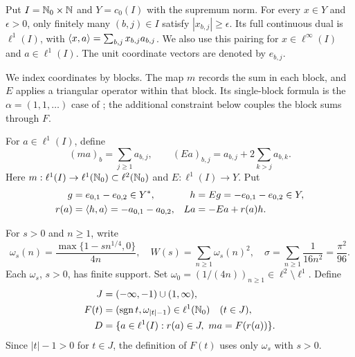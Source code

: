 Put $I=\mathbb N_0\times\mathbb N$ and $Y=c_0(I)$ with the supremum norm.
For every $x\in Y$ and $\epsilon>0$, only finitely many $(b,j)\in I$
satisfy $|x_{b,j}|\ge\epsilon$. Its full continuous dual is $\ell^1(I)$,
with $\langle x,a\rangle=\sum_{b,j}x_{b,j}a_{b,j}$. We also use this pairing
for $x\in\ell^\infty(I)$ and $a\in\ell^1(I)$.
The unit coordinate vectors are denoted by $e_{b,j}$.

We index coordinates by blocks. The map $m$ records the sum in each block,
and $E$ applies a triangular operator within that block. Its single-block
formula is the $\alpha=(1,1,\ldots)$ case of
\cite[author version, Example~4.1]{bauschkeetal2011}; the additional constraint below
couples the block sums through $F$.
\begin{definition}
For $a\in\ell^1(I)$, define
\begin{equation}
(ma)_b=\sum_{j\ge1}a_{b,j},\qquad
(Ea)_{b,j}=a_{b,j}+2\sum_{k>j}a_{b,k}.
\label{eq:D4}
\end{equation}
Here $m:\ell^1(I)\to\ell^1(\mathbb N_0)\subset\ell^2(\mathbb N_0)$ and
$E:\ell^1(I)\to Y$. Put
\begin{equation}
\begin{aligned}
g&=e_{0,1}-e_{0,2}\in Y^*,&
h&=Eg=-e_{0,1}-e_{0,2}\in Y,\\
r(a)&=\langle h,a\rangle=-a_{0,1}-a_{0,2},&
La&=-Ea+r(a)h.
\end{aligned}
\label{eq:D5}
\end{equation}
\end{definition}

\begin{definition}
For $s>0$ and $n\ge1$, write
\begin{equation}
\omega_s(n)=\frac{\max\{1-sn^{1/4},0\}}{4n},\quad
W(s)=\sum_{n\ge1}\omega_s(n)^2,\quad
\sigma=\sum_{n\ge1}\frac1{16n^2}=\frac{\pi^2}{96}.
\label{eq:D6}
\end{equation}
Each $\omega_s$, $s>0$, has finite support. Set
$\omega_0=(1/(4n))_{n\ge1}\in\ell^2\setminus\ell^1$. Define
\begin{equation}
\begin{aligned}
J&=(-\infty,-1)\cup(1,\infty),\\
F(t)&=(\operatorname{sgn} t,\omega_{|t|-1})\in\ell^1(\mathbb N_0)\quad(t\in J),\\
D&=\{a\in\ell^1(I):r(a)\in J,\ ma=F(r(a))\}.
\end{aligned}
\label{eq:D7}
\end{equation}
Since $|t|-1>0$ for $t\in J$, the definition of $F(t)$ uses only
$\omega_s$ with $s>0$.
\end{definition}

